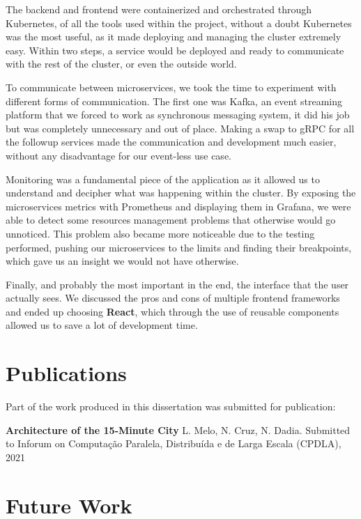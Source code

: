 The backend and frontend were containerized and orchestrated through Kubernetes, of all the tools used within the project, without a doubt Kubernetes was the most useful, as it made deploying and managing the cluster extremely easy. Within two steps, a service would be deployed and ready to communicate with the rest of the cluster, or even the outside world. 

To communicate between microservices, we took the time to experiment with different forms of communication. The first one was Kafka, an event streaming platform that we forced to work as synchronous messaging system, it did his job but was completely unnecessary and out of place. Making a swap to gRPC for all the followup services made the communication and development much easier, without any disadvantage for our event-less use case.

Monitoring was a fundamental piece of the application as it allowed us to understand and decipher what was happening within the cluster. By exposing the microservices metrics with Prometheus and displaying them in Grafana, we were able to detect some resources management problems that otherwise would go unnoticed. This problem also became more noticeable due to the testing performed, pushing our microservices to the limits and finding their breakpoints, which gave us an insight we would not have otherwise.

Finally, and probably the most important in the end, the interface that the user actually sees. We discussed the pros and cons of multiple frontend frameworks and ended up choosing \textbf{React}, which through the use of reusable components allowed us to save a lot of development time.

\section{Publications}

Part of the work produced in this dissertation was submitted for publication:

\begin{description}
    \item \textbf{Architecture of the 15-Minute City} L. Melo, N. Cruz, N. Dadia. Submitted to Inforum on Computação Paralela, Distribuída e de Larga Escala (CPDLA), 2021
\end{description}

\section{Future Work}
\label{s:future_work}


